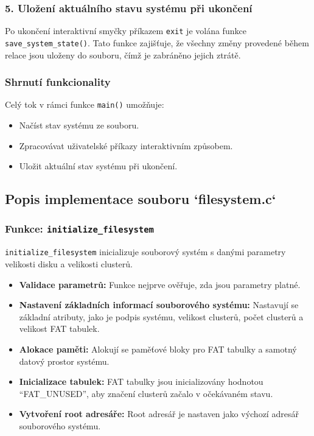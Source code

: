 \documentclass[12pt]{article}
\begin{document}
\subsubsection*{5. Uložení aktuálního stavu systému při ukončení}
Po ukončení interaktivní smyčky příkazem \texttt{exit} je volána funkce \texttt{save\_system\_state()}. Tato funkce zajišťuje, že všechny změny provedené během relace jsou uloženy do souboru, čímž je zabráněno jejich ztrátě.

\subsubsection*{Shrnutí funkcionality}
Celý tok v rámci funkce \texttt{main()} umožňuje:
\begin{itemize}
    \item Načíst stav systému ze souboru.
    \item Zpracovávat uživatelské příkazy interaktivním způsobem.
    \item Uložit aktuální stav systému při ukončení.
\end{itemize}

\subsection*{Popis implementace souboru `filesystem.c`}

\subsubsection*{Funkce: \texttt{initialize\_filesystem}}

\texttt{initialize\_filesystem} inicializuje souborový systém s danými parametry velikosti disku a velikosti clusterů.

\begin{itemize}
    \item \textbf{Validace parametrů:} Funkce nejprve ověřuje, zda jsou parametry platné.
    \item \textbf{Nastavení základních informací souborového systému:} Nastavují se základní atributy, jako je podpis systému, velikost clusterů, počet clusterů a velikost FAT tabulek.
    \item \textbf{Alokace paměti:} Alokují se paměťové bloky pro FAT tabulky a samotný datový prostor systému.
    \item \textbf{Inicializace tabulek:} FAT tabulky jsou inicializovány hodnotou ``FAT\_UNUSED'', aby značení clusterů začalo v očekávaném stavu.
    \item \textbf{Vytvoření root adresáře:} Root adresář je nastaven jako výchozí adresář souborového systému.
\end{itemize}
\end{document}
